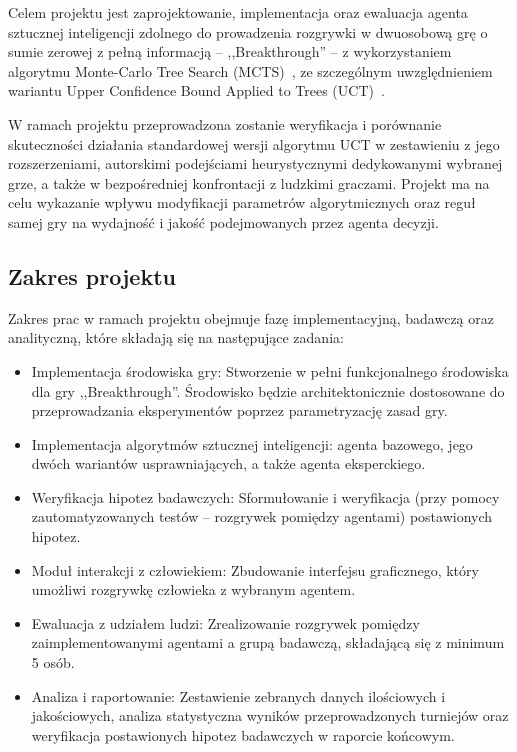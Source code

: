 \documentclass{article}
\begin{document}
Celem projektu jest zaprojektowanie, implementacja oraz ewaluacja agenta sztucznej inteligencji zdolnego do prowadzenia rozgrywki w dwuosobową grę o sumie zerowej z pełną informacją – ,,Breakthrough'' – z wykorzystaniem algorytmu Monte-Carlo Tree Search (MCTS)~\cite{coulom2006efficient}, ze szczególnym uwzględnieniem wariantu Upper Confidence Bound Applied to Trees (UCT)~\cite{kocsis2006bandit}.

W ramach projektu przeprowadzona zostanie weryfikacja i porównanie skuteczności działania standardowej wersji algorytmu UCT w zestawieniu z jego rozszerzeniami, autorskimi podejściami heurystycznymi dedykowanymi wybranej grze, a także w bezpośredniej konfrontacji z ludzkimi graczami. Projekt ma na celu wykazanie wpływu modyfikacji parametrów algorytmicznych oraz reguł samej gry na wydajność i jakość podejmowanych przez agenta decyzji.

\subsection{Zakres projektu}

Zakres prac w ramach projektu obejmuje fazę implementacyjną, badawczą oraz analityczną, które składają się na następujące zadania:

\begin{itemize}
    \item Implementacja środowiska gry: Stworzenie w pełni funkcjonalnego środowiska dla gry ,,Breakthrough''. Środowisko będzie architektonicznie dostosowane do przeprowadzania eksperymentów poprzez parametryzację zasad gry.
    \item Implementacja algorytmów sztucznej inteligencji: agenta bazowego, jego dwóch wariantów usprawniających, a także agenta eksperckiego.
    \item Weryfikacja hipotez badawczych: Sformułowanie i weryfikacja (przy pomocy zautomatyzowanych testów -- rozgrywek pomiędzy agentami) postawionych hipotez.
    \item Moduł interakcji z człowiekiem: Zbudowanie interfejsu graficznego, który umożliwi rozgrywkę człowieka z wybranym agentem.
    \item Ewaluacja z udziałem ludzi: Zrealizowanie rozgrywek pomiędzy zaimplementowanymi agentami a grupą badawczą, składającą się z minimum 5 osób.
    \item Analiza i raportowanie: Zestawienie zebranych danych ilościowych i jakościowych, analiza statystyczna wyników przeprowadzonych turniejów oraz weryfikacja postawionych hipotez badawczych w raporcie końcowym.
\end{itemize}
\end{document}
